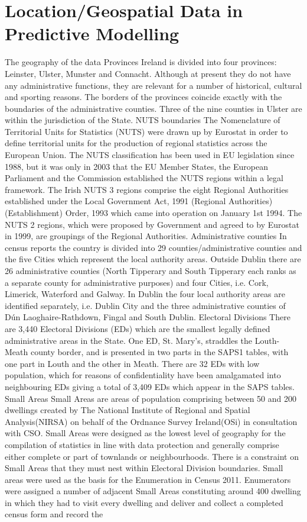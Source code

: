 \section{Location/Geospatial Data in Predictive Modelling}
The geography of the data  Provinces  Ireland is divided into four provinces: Leinster, Ulster, Munster and Connacht. Although at present they do not have any  administrative functions, they are relevant for a number of historical, cultural and sporting reasons. The borders of the  provinces coincide exactly with the boundaries of the administrative counties. Three of the nine counties in Ulster are  within the jurisdiction of the State.  NUTS boundaries  The Nomenclature of Territorial Units for Statistics (NUTS) were drawn up by Eurostat in order to define territorial  units for the production of regional statistics across the European Union. The NUTS classification has been used in EU  legislation since 1988, but it was only in 2003 that the EU Member States, the European Parliament and the  Commission established the NUTS regions within a legal framework.  The Irish NUTS 3 regions comprise the eight Regional Authorities established under the Local Government Act, 1991  (Regional Authorities) (Establishment) Order, 1993 which came into operation on January 1st 1994. The NUTS 2  regions, which were proposed by Government and agreed to by Eurostat in 1999, are groupings of the Regional  Authorities.  Administrative counties  In census reports the country is divided into 29 counties/administrative counties and the five Cities which represent the  local authority areas. Outside Dublin there are 26 administrative counties (North Tipperary and South Tipperary each  ranks as a separate county for administrative purposes) and four Cities, i.e. Cork, Limerick, Waterford and Galway. In  Dublin the four local authority areas are identified separately, i.e. Dublin City and the three administrative counties of  Dún Laoghaire-Rathdown, Fingal and South Dublin.  Electoral Divisions  There are 3,440 Electoral Divisions (EDs) which are the smallest legally defined administrative areas in the State. One  ED, St. Mary's, straddles the Louth-Meath county border, and is presented in two parts in the SAPS1 tables, with one  part in Louth and the other in Meath. There are 32 EDs with low population, which for reasons of confidentiality have  been amalgamated into neighbouring EDs giving a total of 3,409 EDs which appear in the SAPS tables.  Small Areas  Small Areas are areas of population comprising between 50 and 200 dwellings created by The National Institute of  Regional and Spatial Analysis(NIRSA) on behalf of the Ordnance Survey Ireland(OSi) in consultation with CSO. Small  Areas were designed as the lowest level of geography for the compilation of statistics in line with data protection and  generally comprise either complete or part of townlands or neighbourhoods. There is a constraint on Small Areas that  they must nest within Electoral Division boundaries.  Small areas were used as the basis for the Enumeration in Census 2011. Enumerators were assigned a number of  adjacent Small Areas constituting around 400 dwelling in which they had to visit every dwelling and deliver and collect  a completed census form and record the 